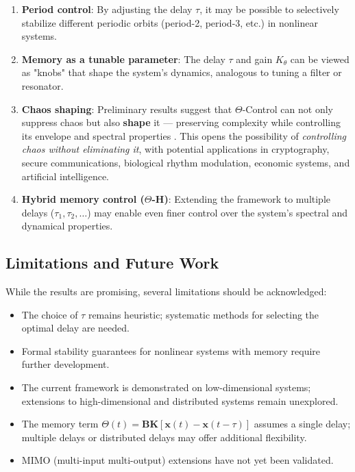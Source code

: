 \documentclass[12pt,a4paper]{article}
\begin{document}
\begin{enumerate}
    \item \textbf{Period control}: By adjusting the delay $\tau$, 
    it may be possible to selectively stabilize different periodic 
    orbits (period-2, period-3, etc.) in nonlinear systems.
    
    \item \textbf{Memory as a tunable parameter}: The delay $\tau$ 
    and gain $K_\theta$ can be viewed as "knobs" that shape the 
    system's dynamics, analogous to tuning a filter or resonator.
    
    \item \textbf{Chaos shaping}: Preliminary results suggest that 
    $\Theta$-Control can not only suppress chaos but also 
    \textbf{shape} it — preserving complexity while controlling 
    its envelope and spectral properties \citep{Ott1990}. 
    This opens the possibility of \textit{controlling chaos 
    without eliminating it}, with potential applications in 
    cryptography, secure communications, biological rhythm 
    modulation, economic systems, and artificial intelligence.
    
    \item \textbf{Hybrid memory control ($\Theta$-H)}: Extending 
    the framework to multiple delays ($\tau_1, \tau_2, \ldots$) may 
    enable even finer control over the system's spectral and 
    dynamical properties.
\end{enumerate}

\subsection{Limitations and Future Work}

While the results are promising, several limitations should be 
acknowledged:

\begin{itemize}
    \item The choice of $\tau$ remains heuristic; systematic 
    methods for selecting the optimal delay are needed.
    
    \item Formal stability guarantees for nonlinear systems with 
    memory require further development.
    
    \item The current framework is demonstrated on low-dimensional 
    systems; extensions to high-dimensional and distributed 
    systems remain unexplored.
    
    \item The memory term $\Theta(t) = \mathbf{BK}[\mathbf{x}(t) - 
    \mathbf{x}(t-\tau)]$ assumes a single delay; multiple delays 
    or distributed delays may offer additional flexibility.
    
    \item MIMO (multi-input multi-output) extensions have not yet 
    been validated.
\end{itemize}
\end{document}
